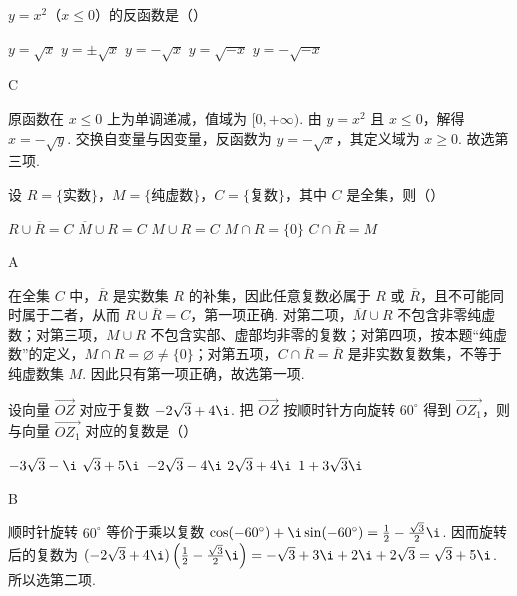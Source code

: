 \documentclass[UTF8,a4paper,oneside,11pt]{ctexbook}
\begin{document}
\begin{problem}

\(y = x^{2}\)（\(x \leqslant 0\)）的反函数是（\quad）

\choicesfive
    {\(y = \sqrt{x} \)}
    {\(y = \pm \sqrt{x} \)}
    {\(y = -\sqrt{x} \)}
    {\(y = \sqrt{-x} \)}
    {\(y = -\sqrt{-x} \)}
\begin{answer}
C
\end{answer}

\begin{solution}
原函数在 \(x\leqslant0\) 上为单调递减，值域为 \([0,+\infty)\). 由 \(y=x^{2}\) 且 \(x\leqslant0\)，解得 \(x=-\sqrt y\). 交换自变量与因变量，反函数为 \(y=-\sqrt x\)，其定义域为 \(x\geqslant0\). 故选第三项.
\end{solution}
\end{problem}

\begin{problem}

设 \(R = \{\text{实数}\}\)，\(M = \{\text{纯虚数}\}\)，\(C = \{\text{复数}\}\)，其中 \(C\) 是全集，则（\quad）

\choicesfive
    {\(R \cup \overline{R} = C\)}
    {\(\overline{M} \cup R = C\)}
    {\(M \cup R = C\)}
    {\(M \cap R = \{0\} \)}
    {\(C \cap \overline{R} = M\)}
\begin{answer}
A
\end{answer}

\begin{solution}
在全集 \(C\) 中，\(\overline R\) 是实数集 \(R\) 的补集，因此任意复数必属于 \(R\) 或 \(\overline R\)，且不可能同时属于二者，从而 \(R\cup\overline R=C\)，第一项正确. 对第二项，\(\overline M\cup R\) 不包含非零纯虚数；对第三项，\(M\cup R\) 不包含实部、虚部均非零的复数；对第四项，按本题“纯虚数”的定义，\(M\cap R=\varnothing\ne\{0\}\)；对第五项，\(C\cap\overline R=\overline R\) 是非实数复数集，不等于纯虚数集 \(M\). 因此只有第一项正确，故选第一项.
\end{solution}
\end{problem}

\begin{problem}

设向量 \(\overrightarrow{OZ}\) 对应于复数 \(-2\sqrt{3} + 4\i\). 把 \(\overrightarrow{OZ}\) 按顺时针方向旋转 \(60^\circ\) 得到 \(\overrightarrow{OZ_1}\)，则与向量 \(\overrightarrow{OZ_1}\) 对应的复数是（\quad）

\choicesfive
    {\(-3\sqrt{3} - \i\)}
    {\(\sqrt{3} + 5\i\)}
    {\(-2\sqrt{3} - 4\i\)}
    {\(2\sqrt{3} + 4\i\)}
    {\(1 + 3\sqrt{3}\i \)}
\begin{answer}
B
\end{answer}

\begin{solution}
顺时针旋转 \(60^{\circ}\) 等价于乘以复数
\(\cos(-60^{\circ})+\i\sin(-60^{\circ})=\frac12-\frac{\sqrt3}{2}\i\). 因而旋转后的复数为
\((-2\sqrt3+4\i)\left(\frac12-\frac{\sqrt3}{2}\i\right)=-\sqrt3+3\i+2\i+2\sqrt3=\sqrt3+5\i\). 所以选第二项.
\end{solution}
\end{problem}
\end{document}
